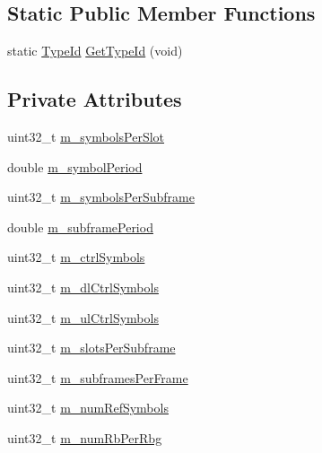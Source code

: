 \subsection*{Static Public Member Functions}
\begin{DoxyCompactItemize}
\item 
static \hyperlink{classns3_1_1TypeId}{Type\+Id} \hyperlink{classns3_1_1MmWavePhyMacCommon_ad5a24e5238185c29c2098f4417babddf}{Get\+Type\+Id} (void)
\end{DoxyCompactItemize}
\subsection*{Private Attributes}
\begin{DoxyCompactItemize}
\item 
uint32\+\_\+t \hyperlink{classns3_1_1MmWavePhyMacCommon_a457f3df9406acbc6cecc4a19e0cf93bf}{m\+\_\+symbols\+Per\+Slot}
\item 
double \hyperlink{classns3_1_1MmWavePhyMacCommon_a89e43c7e5b4a943b65242970705af418}{m\+\_\+symbol\+Period}
\item 
uint32\+\_\+t \hyperlink{classns3_1_1MmWavePhyMacCommon_afca83ca9bb4705b1fc9bdd43b831c64d}{m\+\_\+symbols\+Per\+Subframe}
\item 
double \hyperlink{classns3_1_1MmWavePhyMacCommon_a433abaa09d456615ba3e5e0fe3ae7642}{m\+\_\+subframe\+Period}
\item 
uint32\+\_\+t \hyperlink{classns3_1_1MmWavePhyMacCommon_aa43c2ccaed42d295fbab14ce77f9e888}{m\+\_\+ctrl\+Symbols}
\item 
uint32\+\_\+t \hyperlink{classns3_1_1MmWavePhyMacCommon_aa2a1bf369b3b10c206b1e84718a563a4}{m\+\_\+dl\+Ctrl\+Symbols}
\item 
uint32\+\_\+t \hyperlink{classns3_1_1MmWavePhyMacCommon_a221169a7e39b13f86c4795060350d406}{m\+\_\+ul\+Ctrl\+Symbols}
\item 
uint32\+\_\+t \hyperlink{classns3_1_1MmWavePhyMacCommon_a98ab098ec394b9ededfad71a1c82e374}{m\+\_\+slots\+Per\+Subframe}
\item 
uint32\+\_\+t \hyperlink{classns3_1_1MmWavePhyMacCommon_a887821cbbb1b758b6a736c46b0039d6a}{m\+\_\+subframes\+Per\+Frame}
\item 
uint32\+\_\+t \hyperlink{classns3_1_1MmWavePhyMacCommon_ac17231d936d011081c0770e2c27a9681}{m\+\_\+num\+Ref\+Symbols}
\item 
uint32\+\_\+t \hyperlink{classns3_1_1MmWavePhyMacCommon_a140ad0d28db2240d5b267050843594fd}{m\+\_\+num\+Rb\+Per\+Rbg}
\item 

\end{DoxyCompactItemize}
